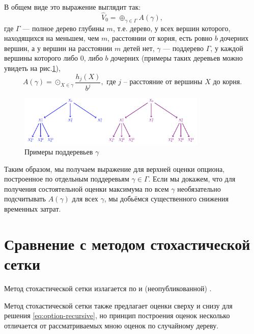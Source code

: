 \documentclass[specialist,
               substylefile = ../spbu.rtx,
               subf,href,colorlinks=true, 12pt]{disser}
\newcommand{\Vhat}{\hat{V}}
\begin{document}
	В общем виде это выражение выглядит так:
	\begin{equation}\label{eq:tropic}
		\Vhat_0 = \oplus_{\gamma\in\Gamma} A\left(\gamma\right),
	\end{equation}
	где $\Gamma$ --- полное дерево глубины $m$, т.е. дерево, у всех вершин которого, находящихся на меньшем, чем $m$, расстоянии от корня, есть ровно $b$ дочерних вершин, а у вершин на расстоянии $m$ детей нет, $\gamma$ --- поддерево $\Gamma$, у каждой вершины которого либо 0, либо $b$ дочерних (примеры таких деревьев можно увидеть на рис.\ref{fig:exponential subtrees}), \begin{equation}
		A\left(\gamma\right) = \odot_{X\in\gamma}\frac{h_j\left(X\right)}{b^j}, \text{ где $j$ -- расстояние от вершины $X$ до корня.}
	\end{equation}

	\begin{figure}[h]
	    \centering
		\includegraphics[width=0.8\textwidth]{exponential_subtrees.pdf}
		\caption{Примеры поддеревьев $\gamma$}
		\label{fig:exponential subtrees}
	\end{figure}

	Таким образом, мы получаем выражение для верхней оценки опциона, построенное по отдельным поддеревьям $\gamma\in\Gamma$. Если мы докажем, что для получения состоятельной оценки максимума по всем $\gamma$ необязательно подсчитывать $A\left(\gamma\right)$ для всех $\gamma$, мы добьёмся существенного снижения временных затрат.

\chapter{Сравнение с методом стохастической сетки}
	Метод стохастической сетки излагается по \cite{Broadie2004} и (неопубликованной) \cite{Kashtanov2015}.

	Метод стохастической сетки также предлагает оценки сверху и снизу для решения \eqref{eq:option-recursive}, но принцип построения оценок несколько отличается от рассматриваемых мною оценок по случайному дереву.
\end{document}

